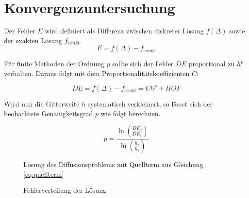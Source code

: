 \documentclass[11pt, ngerman,colorback,accentcolor=tud2d]{tudreport}
\begin{document}
\section{Konvergenzuntersuchung}
\label{sec:Konvergenzuntersuchung}

Der Fehler $E$ wird definiert als Differenz zwischen diskreter Lösung $f(\Delta)$ sowie
der exakten Lösung $f_{exakt}$.
\begin{equation*}
  E=f(\Delta) - f_{exakt}
\end{equation*}

Für finite Methoden der Ordnung $p$ sollte sich der Fehler $DE$ proportional zu
$h^p$ verhalten. Daraus folgt mit dem Proportionalitätskoeffizienten $C$:

\begin{equation*}
  DE=f(\Delta) - f_{exakt}=C h^p + HOT
\end{equation*}

Wird nun die Gitterweite $h$ systematisch verkleinert, so lässst sich der beobachtete
Genauigkeitsgrad $p$ wie folgt berechnen.

\begin{equation}
  p=\frac{\ln \left(\frac{DE_2}{DE_1}\right)}{\ln \left(\frac{h_2}{h_1}\right)}
\end{equation}

\begin{figure}
\caption{Lösung des Diffusionsproblems mit Quellterm aus Gleichung \ref{eq:quellterm}}
\end{figure}

\begin{figure}
\caption{Fehlerverteilung der Lösung}
\end{figure}
\end{document}
